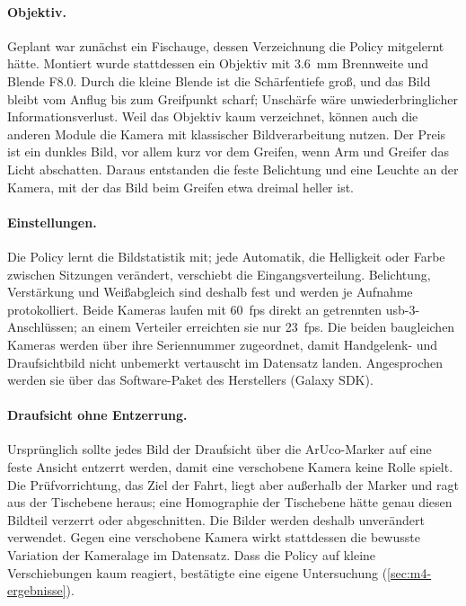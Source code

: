 \paragraph{Objektiv.} Geplant war zunächst ein Fischauge, dessen Verzeichnung die Policy
mitgelernt hätte. Montiert wurde stattdessen ein Objektiv mit \SI{3.6}{\milli\metre} Brennweite
und Blende F8.0. Durch die kleine Blende ist die Schärfentiefe groß, und das Bild bleibt vom
Anflug bis zum Greifpunkt scharf; Unschärfe wäre unwiederbringlicher Informationsverlust. Weil
das Objektiv kaum verzeichnet, können auch die anderen Module die Kamera mit klassischer
Bildverarbeitung nutzen. Der Preis ist ein dunkles Bild, vor allem kurz vor dem Greifen, wenn Arm
und Greifer das Licht abschatten. Daraus entstanden die feste Belichtung und eine Leuchte an der
Kamera, mit der das Bild beim Greifen etwa dreimal heller ist.

\paragraph{Einstellungen.} Die Policy lernt die Bildstatistik mit; jede Automatik, die
Helligkeit oder Farbe zwischen Sitzungen verändert, verschiebt die Eingangsverteilung.
Belichtung, Verstärkung und Weißabgleich sind deshalb fest und werden je Aufnahme protokolliert.
Beide Kameras laufen mit \SI{60}{fps} direkt an getrennten \ac{usb}-3-Anschlüssen; an einem
Verteiler erreichten sie nur \SI{23}{fps}. Die beiden baugleichen Kameras werden über ihre
Seriennummer zugeordnet, damit Handgelenk- und Draufsichtbild nicht unbemerkt vertauscht im
Datensatz landen. Angesprochen werden sie über das Software-Paket des Herstellers (Galaxy SDK).

\paragraph{Draufsicht ohne Entzerrung.} Ursprünglich sollte jedes Bild der Draufsicht über die
ArUco-Marker auf eine feste Ansicht entzerrt werden, damit eine verschobene Kamera keine Rolle
spielt. Die Prüfvorrichtung, das Ziel der Fahrt, liegt aber außerhalb der Marker und ragt aus der
Tischebene heraus; eine Homographie der Tischebene hätte genau diesen Bildteil verzerrt oder
abgeschnitten. Die Bilder werden deshalb unverändert verwendet. Gegen eine verschobene Kamera
wirkt stattdessen die bewusste Variation der Kameralage im Datensatz. Dass die Policy auf kleine
Verschiebungen kaum reagiert, bestätigte eine eigene Untersuchung (\cref{sec:m4-ergebnisse}).

